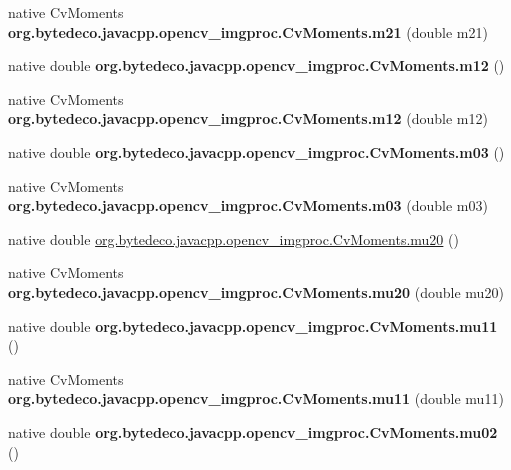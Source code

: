 \begin{DoxyCompactItemize}
native Cv\+Moments {\bfseries org.\+bytedeco.\+javacpp.\+opencv\+\_\+imgproc.\+Cv\+Moments.\+m21} (double m21)
\item 
\mbox{\label{group__imgproc_ga23de4704057dce4c2c50aa952dfcf20e}} 
native double {\bfseries org.\+bytedeco.\+javacpp.\+opencv\+\_\+imgproc.\+Cv\+Moments.\+m12} ()
\item 
\mbox{\label{group__imgproc_ga0cdb06a8bab4142b1bf0676b0e96f56e}} 
native Cv\+Moments {\bfseries org.\+bytedeco.\+javacpp.\+opencv\+\_\+imgproc.\+Cv\+Moments.\+m12} (double m12)
\item 
\mbox{\label{group__imgproc_gaf0bc710ce84238d2b0578aeb52b13023}} 
native double {\bfseries org.\+bytedeco.\+javacpp.\+opencv\+\_\+imgproc.\+Cv\+Moments.\+m03} ()
\item 
\mbox{\label{group__imgproc_ga02f8d9e7489222bf50d3f07aca083a23}} 
native Cv\+Moments {\bfseries org.\+bytedeco.\+javacpp.\+opencv\+\_\+imgproc.\+Cv\+Moments.\+m03} (double m03)
\item 
native double \hyperlink{group__imgproc_ga0ad47b9e5cae2b42681f6614aab8adfc}{org.\+bytedeco.\+javacpp.\+opencv\+\_\+imgproc.\+Cv\+Moments.\+mu20} ()
\item 
\mbox{\label{group__imgproc_ga1b0e1f4119d7696d58dbf6dd28fceec6}} 
native Cv\+Moments {\bfseries org.\+bytedeco.\+javacpp.\+opencv\+\_\+imgproc.\+Cv\+Moments.\+mu20} (double mu20)
\item 
\mbox{\label{group__imgproc_gaa30ca889e310f30138611a8b37ea44f1}} 
native double {\bfseries org.\+bytedeco.\+javacpp.\+opencv\+\_\+imgproc.\+Cv\+Moments.\+mu11} ()
\item 
\mbox{\label{group__imgproc_gaca80e02e81974866b4f743b2560dfc33}} 
native Cv\+Moments {\bfseries org.\+bytedeco.\+javacpp.\+opencv\+\_\+imgproc.\+Cv\+Moments.\+mu11} (double mu11)
\item 
\mbox{\label{group__imgproc_gad3a4a21ebf1f30725bc5406106d33c00}} 
native double {\bfseries org.\+bytedeco.\+javacpp.\+opencv\+\_\+imgproc.\+Cv\+Moments.\+mu02} ()
\item 
\mbox{\label{group__imgproc_ga88d8839e9b8fc2aed9a2fb3f39713427}} 

\end{DoxyCompactItemize}
